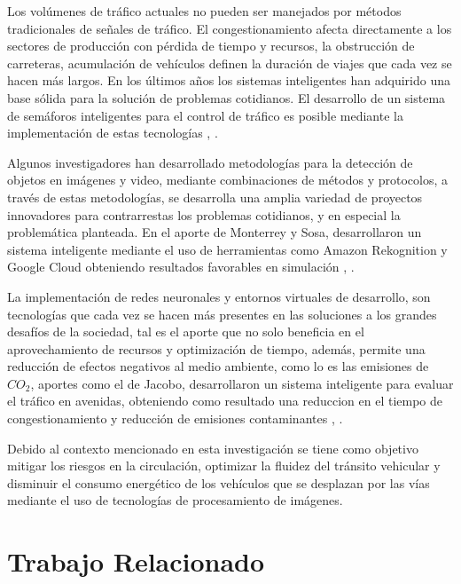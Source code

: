 \documentclass[conference]{IEEEtran}
\begin{document}
Los volúmenes de tráfico actuales no pueden ser manejados por métodos tradicionales de señales de tráfico. El congestionamiento afecta
directamente a los sectores de producción con pérdida de tiempo y recursos, la obstrucción de carreteras, acumulación de vehículos definen la duración de viajes que cada vez se hacen más largos. En los últimos años los sistemas inteligentes han adquirido una base sólida para la solución de problemas
cotidianos. El desarrollo de un sistema de semáforos inteligentes para el control de tráfico es posible mediante la implementación de estas tecnologías \cite{Tang2024}, \cite{Manzo2019}.

Algunos investigadores han desarrollado metodologías para la detección de
objetos en imágenes y video, mediante combinaciones de métodos y 
protocolos, a través de estas metodologías, se desarrolla una amplia variedad de proyectos innovadores para contrarrestas los problemas cotidianos, y en especial la problemática planteada. En el aporte de Monterrey y Sosa, desarrollaron un sistema inteligente mediante el uso de herramientas como Amazon Rekognition y Google Cloud obteniendo resultados favorables en simulación \cite{Segarra2022}, \cite{Monterrey2020}.

La implementación de redes neuronales y entornos virtuales de desarrollo, son tecnologías que cada vez se hacen más presentes en las soluciones a los grandes desafíos de la sociedad, tal es el aporte que no solo beneficia en el aprovechamiento de recursos y optimización de tiempo, además, permite una reducción de efectos negativos al medio ambiente, como lo es las emisiones de $CO_2$, aportes como el de Jacobo, desarrollaron un sistema inteligente para evaluar el tráfico en avenidas, obteniendo como resultado una reduccion en el tiempo de congestionamiento y reducción de emisiones contaminantes \cite{Alvarez2021}, \cite{Jacobo2015}.

Debido al contexto mencionado en esta investigación se tiene como objetivo mitigar los riesgos en la circulación, optimizar la fluidez del tránsito vehicular y disminuir el consumo energético de los vehículos que se desplazan por las vías mediante el uso de tecnologías de procesamiento de imágenes.

\section{Trabajo Relacionado}
\end{document}
